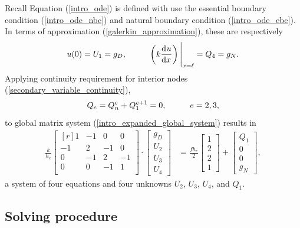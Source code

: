 Recall Equation (\ref{intro_ode}) is defined with use the  essential boundary condition (\ref{intro_ode_nbc}) and  natural boundary condition (\ref{intro_ode_ebc}).  In terms of approximation (\ref{galerkin_approximation}), these are respectively
$$u(0) = U_1 = g_D, \hspace{10mm} \left( k \totder{u}{x} \right) \Bigg|_{x=\ell} = Q_4 = g_N.$$
Applying continuity requirement for interior nodes (\ref{secondary_variable_continuity}),
$$Q_e = Q_n^e + Q_1^{e+1} = 0, \hspace{10mm} e = 2,3,$$
to global matrix system (\ref{intro_expanded_global_system}) results in
\begin{align}
  \label{intro_final_global_system}
  \frac{k}{h_e}
  \begin{bmatrix}[r]
     1 & -1 &  0 &  0 \\
    -1 &  2 & -1 &  0 \\
     0 & -1 &  2 & -1 \\
     0 &  0 & -1 &  1 \\
  \end{bmatrix} \cdot
  \begin{bmatrix} g_D \\ U_2 \\ U_3 \\ U_4 \end{bmatrix} &=
  \frac{f h_e}{2}
  \begin{bmatrix} 1   \\ 2   \\ 2   \\ 1   \end{bmatrix} +
  \begin{bmatrix} Q_1 \\ 0   \\ 0   \\ g_N   \end{bmatrix},
\end{align}
a system of four equations and four unknowns $U_2$, $U_3$, $U_4$, and $Q_1$.

\subsection{Solving procedure} \label{ssn_galerkin_solve}

